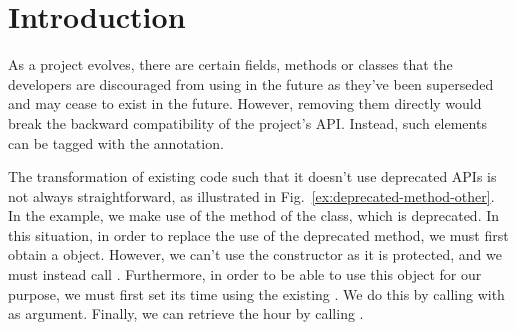 \documentclass[runningheads,a4paper]{llncs}
\begin{document}






\section{Introduction}\label{sec:intro}

As a project evolves, there are certain fields, methods or classes
that the developers are discouraged from using in the future as
they've been superseded and may cease to exist in the future.
However, removing them directly would break the backward compatibility
of the project's API.  Instead, such elements can be tagged with the
 annotation.  %


The transformation of existing code such that it doesn't use deprecated APIs
is not always straightforward,
as illustrated in Fig.~\ref{ex:deprecated-method-other}. In the example, we
make use of the  method of the  class,
which is deprecated.
In this situation, in order to replace the use of the deprecated method,
we must first obtain a  object.
However, we can't use the  constructor as it is protected,
and we must instead call .
Furthermore, in order to be able to use this  object for our purpose,
we must first set its time using the existing .
We do this by calling  with  as argument.
Finally, we can retrieve the hour by calling
.
\end{document}
